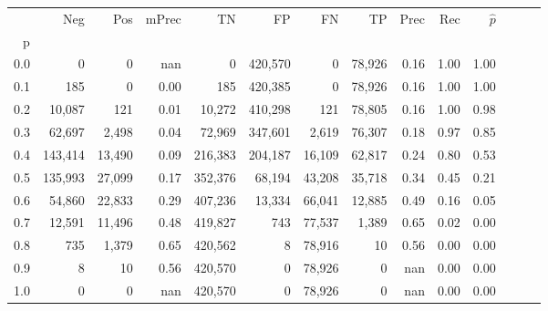 \begin{tabular}{rrrrrrrrrrrrrr}
\toprule
{} &      Neg &     Pos & mPrec &       TN &       FP &      FN &      TP &  Prec &   Rec & $\hat{p}$ \\
p   &          &         &       &          &          &         &         &       &       &           \\
\midrule
0.0 &        0 &       0 &   nan &        0 &  420,570 &       0 &  78,926 &  0.16 &  1.00 &      1.00 \\
0.1 &      185 &       0 &  0.00 &      185 &  420,385 &       0 &  78,926 &  0.16 &  1.00 &      1.00 \\
0.2 &   10,087 &     121 &  0.01 &   10,272 &  410,298 &     121 &  78,805 &  0.16 &  1.00 &      0.98 \\
0.3 &   62,697 &   2,498 &  0.04 &   72,969 &  347,601 &   2,619 &  76,307 &  0.18 &  0.97 &      0.85 \\
0.4 &  143,414 &  13,490 &  0.09 &  216,383 &  204,187 &  16,109 &  62,817 &  0.24 &  0.80 &      0.53 \\
0.5 &  135,993 &  27,099 &  0.17 &  352,376 &   68,194 &  43,208 &  35,718 &  0.34 &  0.45 &      0.21 \\
0.6 &   54,860 &  22,833 &  0.29 &  407,236 &   13,334 &  66,041 &  12,885 &  0.49 &  0.16 &      0.05 \\
0.7 &   12,591 &  11,496 &  0.48 &  419,827 &      743 &  77,537 &   1,389 &  0.65 &  0.02 &      0.00 \\
0.8 &      735 &   1,379 &  0.65 &  420,562 &        8 &  78,916 &      10 &  0.56 &  0.00 &      0.00 \\
0.9 &        8 &      10 &  0.56 &  420,570 &        0 &  78,926 &       0 &   nan &  0.00 &      0.00 \\
1.0 &        0 &       0 &   nan &  420,570 &        0 &  78,926 &       0 &   nan &  0.00 &      0.00 \\
\bottomrule
\end{tabular}
